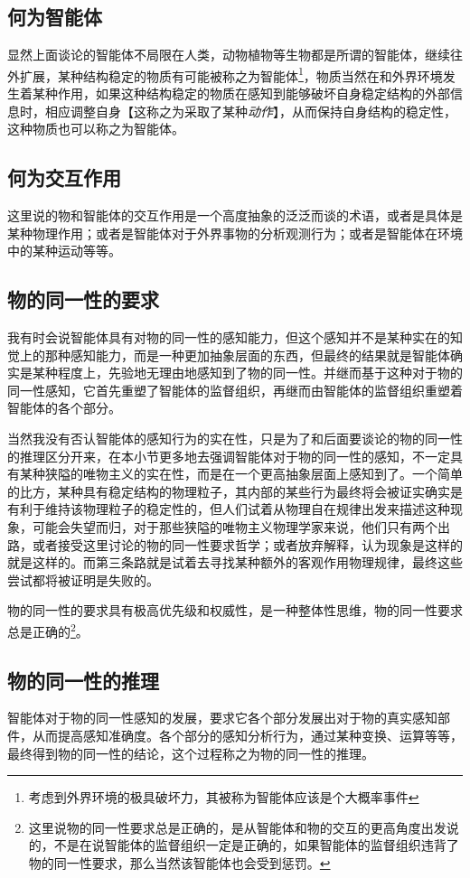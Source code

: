\documentclass[12pt,oneside]{book}
\begin{document}
\subsection{何为智能体}
显然上面谈论的智能体不局限在人类，动物植物等生物都是所谓的智能体，继续往外扩展，某种结构稳定的物质有可能被称之为智能体\footnote{考虑到外界环境的极具破坏力，其被称为智能体应该是个大概率事件}，物质当然在和外界环境发生着某种作用，如果这种结构稳定的物质在感知到能够破坏自身稳定结构的外部信息时，相应调整自身【这称之为采取了某种\emph{动作}】，从而保持自身结构的稳定性，这种物质也可以称之为智能体。


\subsection{何为交互作用}
这里说的物和智能体的交互作用是一个高度抽象的泛泛而谈的术语，或者是具体是某种物理作用；或者是智能体对于外界事物的分析观测行为；或者是智能体在环境中的某种运动等等。


\subsection{物的同一性的要求}
我有时会说智能体具有对物的同一性的感知能力，但这个感知并不是某种实在的知觉上的那种感知能力，而是一种更加抽象层面的东西，但最终的结果就是智能体确实是某种程度上，先验地无理由地感知到了物的同一性。并继而基于这种对于物的同一性感知，它首先重塑了智能体的监督组织，再继而由智能体的监督组织重塑着智能体的各个部分。

当然我没有否认智能体的感知行为的实在性，只是为了和后面要谈论的物的同一性的推理区分开来，在本小节更多地去强调智能体对于物的同一性的感知，不一定具有某种狭隘的唯物主义的实在性，而是在一个更高抽象层面上感知到了。一个简单的比方，某种具有稳定结构的物理粒子，其内部的某些行为最终将会被证实确实是有利于维持该物理粒子的稳定性的，但人们试着从物理自在规律出发来描述这种现象，可能会失望而归，对于那些狭隘的唯物主义物理学家来说，他们只有两个出路，或者接受这里讨论的物的同一性要求哲学；或者放弃解释，认为现象是这样的就是这样的。而第三条路就是试着去寻找某种额外的客观作用物理规律，最终这些尝试都将被证明是失败的。

物的同一性的要求具有极高优先级和权威性，是一种整体性思维，物的同一性要求总是正确的\footnote{这里说物的同一性要求总是正确的，是从智能体和物的交互的更高角度出发说的，不是在说智能体的监督组织一定是正确的，如果智能体的监督组织违背了物的同一性要求，那么当然该智能体也会受到惩罚。}。


\subsection{物的同一性的推理}
智能体对于物的同一性感知的发展，要求它各个部分发展出对于物的真实感知部件，从而提高感知准确度。各个部分的感知分析行为，通过某种变换、运算等等，最终得到物的同一性的结论，这个过程称之为物的同一性的推理。
\end{document}
